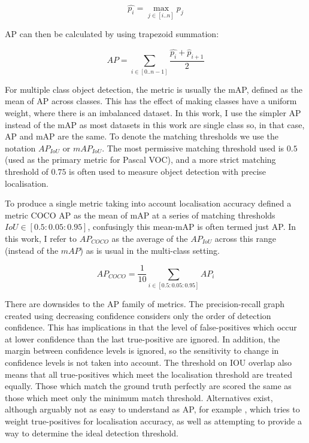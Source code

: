 \begin{equation}
\hat{p_i} = \max_{j \in [i..n]}{p_j}
\label{eq:monotonic_precision}
\end{equation}

\gls{AP} can then be calculated by using trapezoid summation:

\begin{equation}
AP = \sum_{i \in [0..n-1]}\frac{\hat{p_i} + \hat{p}_{i + 1}}{2}
\label{eq:trapezoid}
\end{equation}


For multiple class object detection, the metric is usually the \gls{mAP}, defined as the mean of \gls{AP} across classes. This has the effect of making classes have a uniform weight, where there is an imbalanced dataset.  In this work, I use the simpler \gls{AP} instead of the \gls{mAP} as most datasets in this work are single class so, in that case, \gls{AP} and \gls{mAP} are the same. To denote the matching thresholds we use the notation $AP_{IoU}$ or $mAP_{IoU}$. The most permissive matching threshold used is $0.5$ (used as the primary metric for Pascal VOC), and a more strict matching threshold of $0.75$ is often used to measure object detection with precise localisation.

To produce a single metric taking into account localisation accuracy \cite{Lin2014} defined a metric COCO \gls{AP} as the mean of \gls{mAP} at a series of matching thresholds $ IoU \in [0.5 : 0.05 : 0.95] $, confusingly this mean-\gls{mAP} is often termed just \gls{AP}. In this work, I refer to $AP_{COCO}$ as the average of the $AP_{IoU}$ across this range (instead of the $mAP$) as is usual in the multi-class setting.

\begin{equation}
AP_{COCO} = \frac{1}{10}\sum_{i \in [0.5 : 0.05 : 0.95]}AP_{i}
\label{eq:ap_coco}
\end{equation}

There are downsides to the \gls{AP} family of metrics. The precision-recall graph created using decreasing confidence considers only the order of detection confidence. This has implications in that the level of false-positives which occur at lower confidence than the last true-positive are ignored. In addition, the margin between confidence levels is ignored, so the sensitivity to change in confidence levels is not taken into account. The threshold on \gls{IOU} overlap also means that all true-positives which meet the localisation threshold are treated equally. Those which match the ground truth perfectly are scored the same as those which meet only the minimum match threshold. Alternatives exist, although arguably not as easy to understand as \gls{AP}, for example \cite{Oksuz2018}, which tries to weight true-positives for localisation accuracy, as well as attempting to provide a way to determine the ideal detection threshold.


